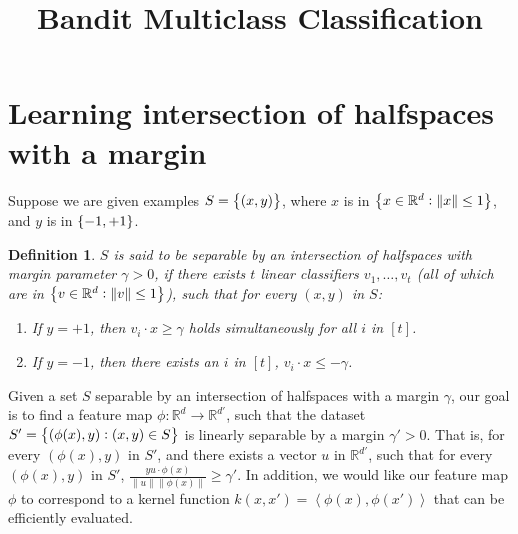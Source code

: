 \documentclass{article}
\title{Bandit Multiclass Classification}
\newcommand{\field}[1]{\mathbb{#1}}
\newcommand{\fR}{\field{R}}
\newcommand{\inner}[1]{ \left\langle {#1} \right\rangle }
\newtheorem{definition}[theorem]{Definition}
\begin{document}

\maketitle

\section{Learning intersection of halfspaces with a margin}
Suppose we are given examples $S = \cbr{(x, y)}$, where $x$ is in $\cbr{x \in \fR^d: \| x \| \leq 1}$, and $y$ is in $\cbr{-1,+1}$.
\begin{definition}
$S$ is said to be separable by an intersection of halfspaces with margin parameter $\gamma > 0$, if there exists $t$ linear classifiers $v_1, \ldots, v_t$ (all of which are in $\cbr{v \in \fR^d: \| v \| \leq 1}$),
such that for every $(x,y)$ in $S$:
\begin{enumerate}
  \item If $y = +1$, then $v_i \cdot x \geq \gamma$ holds simultaneously for all $i$ in $[t]$.
  \item If $y = -1$, then there exists an $i$ in $[t]$, $v_i \cdot x \leq -\gamma$.
\end{enumerate}
\label{def:int-margin}
\end{definition}

Given a set $S$ separable by an intersection of halfspaces with a margin $\gamma$, our goal is to find a feature map $\phi: \fR^d \to \fR^{d'}$, such that the dataset $S' = \cbr{(\phi(x), y): (x,y) \in S}$ is linearly separable by a margin $\gamma' > 0$. That is, for every $(\phi(x), y)$ in $S'$, and
there exists a vector $u$ in $\fR^{d'}$, such that for every $(\phi(x), y)$ in $S'$, $\frac{y u \cdot \phi(x)}{\|u\|\| \phi(x)\|} \geq \gamma'$.
In addition, we would like our feature map $\phi$ to correspond to a kernel function $k(x,x') = \inner{\phi(x), \phi(x')}$ that can be efficiently evaluated.
\end{document}
